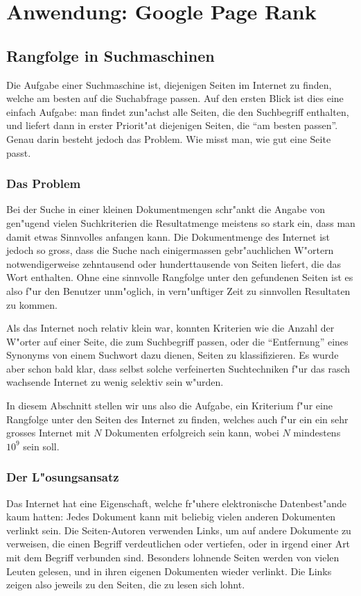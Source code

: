 %
%
%
\section{Anwendung: Google Page Rank} \label{pagerank}

\subsection{Rangfolge in Suchmaschinen}
Die Aufgabe einer Suchmaschine ist, diejenigen Seiten im Internet zu
finden, welche am besten auf die Suchabfrage passen.
Auf den ersten
Blick ist dies eine einfach Aufgabe: man findet zun"achst alle Seiten,
die den Suchbegriff enthalten, und liefert dann in erster Priorit"at
diejenigen Seiten, die ``am besten passen''.
Genau darin besteht jedoch
das Problem.
Wie misst man, wie gut eine Seite passt.

\subsubsection{Das Problem}
Bei der Suche in einer kleinen Dokumentmengen schr"ankt die Angabe von
gen"ugend vielen Suchkriterien die Resultatmenge meistens so stark
ein, dass man damit etwas Sinnvolles anfangen kann.
Die Dokumentmenge
des Internet ist jedoch so gross, dass die Suche nach einigermassen
gebr"auchlichen W"ortern notwendigerweise zehntausend oder hunderttausende
von Seiten liefert, die das Wort enthalten.
Ohne eine sinnvolle Rangfolge
unter den gefundenen Seiten ist es also f"ur den Benutzer unm"oglich, in
vern"unftiger Zeit zu sinnvollen Resultaten zu kommen.

Als das Internet noch relativ klein war, konnten Kriterien wie die
Anzahl der W"orter auf einer Seite, die zum Suchbegriff passen,
oder die ``Entfernung'' eines Synonyms von einem Suchwort dazu dienen,
Seiten zu klassifizieren.
Es wurde aber schon bald klar, dass selbst
solche verfeinerten Suchtechniken f"ur das rasch wachsende Internet
zu wenig selektiv sein w"urden.

In diesem Abschnitt stellen wir uns also die Aufgabe, ein Kriterium
f"ur eine Rangfolge unter den Seiten des Internet zu finden, welches auch
f"ur ein ein sehr grosses Internet mit $N$ Dokumenten erfolgreich sein kann,
wobei $N$ mindestens $10^9$ sein soll.

\subsubsection{Der L"osungsansatz}
Das Internet hat eine Eigenschaft, welche fr"uhere elektronische 
Datenbest"ande kaum hatten: Jedes Dokument kann mit beliebig vielen anderen
Dokumenten verlinkt sein.
Die Seiten-Autoren verwenden Links, um auf
andere Dokumente zu verweisen, die einen Begriff verdeutlichen oder
vertiefen, oder in irgend einer Art mit dem Begriff verbunden sind.
Besonders lohnende Seiten werden von vielen Leuten gelesen, und in ihren
eigenen Dokumenten wieder verlinkt.
Die Links zeigen also jeweils zu den
Seiten, die zu lesen sich lohnt.

